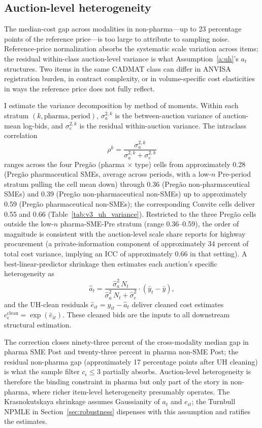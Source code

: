\subsection{Auction-level heterogeneity}

The median-cost gap across modalities in non-pharma---up to 23 percentage points of the reference price---is too large to attribute to sampling noise. Reference-price normalization absorbs the systematic scale variation across items; the residual within-class auction-level variance is what Assumption~\ref{a:uh}'s $a_t$ structures. Two items in the same CADMAT class can differ in ANVISA registration burden, in contract complexity, or in volume-specific cost elasticities in ways the reference price does not fully reflect.

I estimate the variance decomposition by method of moments. Within each stratum $(k, \text{pharma}, \text{period})$, $\sigma_a^{2,k}$ is the between-auction variance of auction-mean log-bids, and $\sigma_e^{2,k}$ is the residual within-auction variance. The intraclass correlation
\[
\rho^k = \frac{\sigma_a^{2,k}}{\sigma_a^{2,k} + \sigma_e^{2,k}}
\]
ranges across the four Preg\~ao (pharma $\times$ type) cells from approximately 0.28 (Preg\~ao pharmaceutical SMEs, average across periods, with a low-$n$ Pre-period stratum pulling the cell mean down) through 0.36 (Preg\~ao non-pharmaceutical SMEs) and 0.39 (Preg\~ao non-pharmaceutical non-SMEs) up to approximately 0.59 (Preg\~ao pharmaceutical non-SMEs); the corresponding Convite cells deliver 0.55 and 0.66 (Table~\ref{tab:v3_uh_variance}). Restricted to the three Preg\~ao cells outside the low-$n$ pharma-SME-Pre stratum (range 0.36--0.59), the order of magnitude is consistent with the auction-level scale share \citet{krasnokutskaya2011} reports for highway procurement (a private-information component of approximately 34 percent of total cost variance, implying an ICC of approximately 0.66 in that setting). A best-linear-predictor shrinkage then estimates each auction's specific heterogeneity as
\[
\hat{a}_t = \frac{\hat\sigma_a^2 \, N_t}{\hat\sigma_a^2 \, N_t + \hat\sigma_e^2} \cdot \left( \bar y_t - \bar y \right),
\]
and the UH-clean residuals $\hat e_{it} = y_{it} - \hat a_t$ deliver cleaned cost estimates $c_\epsilon^{\text{clean}} = \exp(\hat e_{it})$. These cleaned bids are the inputs to all downstream structural estimation.

The correction closes ninety-three percent of the cross-modality median gap in pharma SME Post and twenty-three percent in pharma non-SME Post; the residual non-pharma gap (approximately 17 percentage points after UH cleaning) is what the sample filter $c_\epsilon \le 3$ partially absorbs. Auction-level heterogeneity is therefore the binding constraint in pharma but only part of the story in non-pharma, where richer item-level heterogeneity presumably operates. The Krasnokutskaya shrinkage assumes Gaussianity of $a_t$ and $e_{it}$; the Turnbull NPMLE in Section~\ref{sec:robustness} dispenses with this assumption and ratifies the estimates.

